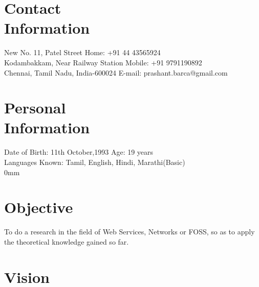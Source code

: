 \documentclass[margin,line]{resume}
\begin{document}
\begin{resume}

    \section{\mysidestyle Contact\\Information}

    New No. 11, Patel Street                            \hfill Home: +91 44 43565924          \vspace{0mm}\\\vspace{0mm}%
    Kodambakkam, Near Railway Station                          \hfill Mobile: +91 9791190892          \vspace{0mm}\\\vspace{0mm}%
    Chennai, Tamil Nadu, India-600024      \hfill E-mail: prashant.barca@gmail.com  \vspace{0mm}\\\vspace{-4.5mm}%

	\section{\mysidestyle Personal\\Information}

Date of Birth: 11th October,1993      \hfill Age: 19 years \vspace{0mm}\\\vspace{0mm}%
Languages Known: Tamil, English, Hindi, Marathi(Basic) \vspace{0mm}\\\vspace
{0mm}%
    \section{\mysidestyle Objective}

    To do a research in the field of Web Services, Networks or FOSS, so as to apply the theoretical knowledge gained so far.
    \section{\mysidestyle Vision}


\end{resume}
\end{document}
